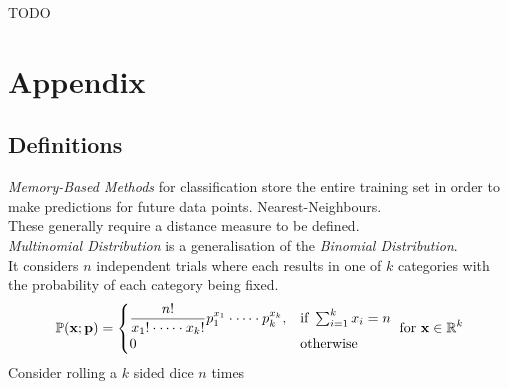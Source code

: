 \documentclass[11pt,a4paper]{article}
\begin{document}
TODO

\newpage
\setcounter{section}{-1}
\section{Appendix}

\subsection{Definitions}

\textit{Memory-Based Methods} for classification store the entire training set in order to make predictions for future data points. \eg Nearest-Neighbours.\\
\nb These generally require a distance measure to be defined.\\

\textit{Multinomial Distribution} is a generalisation of the \textit{Binomial Distribution}.\\
It considers $n$ independent trials where each results in one of $k$ categories with the probability of each category being fixed.\\
$$\mathbb{P}(\textbf{x};\textbf{p})=\begin{cases}\dfrac{n!}{x_1!\cdot\dots\cdot x_k!}p_1^{x_1}\cdot\dots\cdot p_k^{x_k},&\text{if }\sum_{i=1}^kx_i=n\\0&\text{otherwise}\end{cases}\text{ for }\textbf{x}\in\mathbb{R}^k$$
\nb Consider rolling a $k$ sided dice $n$ times
\end{document}
